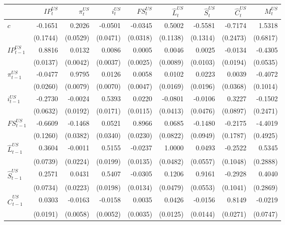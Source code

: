 \begin{sidewaystable}
    \centering
\begin{tabular}{lrrrrrrrr}
        \toprule
        {} &        $IP^{US}_{t}$ &   $\pi^{US}_{t}$ &       $i^{US}_{t}$ &       $FS^{US}_{t}$ &         $\hat{L}^{US}_{t}$ &         $\hat{S}^{US}_{t}$ &         $\hat{C}^{US}_{t}$ &   $M^{US}_{t}$ \\
        \midrule
    $c$ & -0.1651 & 0.2026 & -0.0501 & -0.0345 & 0.5002 & -0.5581 & -0.7174 & 1.5318 \\
     & (0.1744) & (0.0529) & (0.0471) & (0.0318) & (0.1138) & (0.1314) & (0.2473) & (0.6817) \\
    $IP^{US}_{t-1}$ & 0.8816 & 0.0132 & 0.0086 & 0.0005 & 0.0046 & 0.0025 & -0.0134 & -0.4305 \\
     & (0.0137) & (0.0042) & (0.0037) & (0.0025) & (0.0089) & (0.0103) & (0.0194) & (0.0535) \\
    $\pi^{US}_{t-1}$ & -0.0477 & 0.9795 & 0.0126 & 0.0058 & 0.0102 & 0.0223 & 0.0039 & -0.4072 \\
     & (0.0260) & (0.0079) & (0.0070) & (0.0047) & (0.0169) & (0.0196) & (0.0368) & (0.1014) \\
    $i^{US}_{t-1}$ & -0.2730 & -0.0024 & 0.5393 & 0.0220 & -0.0801 & -0.0106 & 0.3227 & -0.1502 \\
     & (0.0632) & (0.0192) & (0.0171) & (0.0115) & (0.0413) & (0.0476) & (0.0897) & (0.2471) \\
    $FS^{US}_{t-1}$ & -0.6609 & -0.1468 & 0.0521 & 0.8966 & 0.0685 & -0.1480 & -0.2175 & -4.4019 \\
     & (0.1260) & (0.0382) & (0.0340) & (0.0230) & (0.0822) & (0.0949) & (0.1787) & (0.4925) \\
    $\hat{L}^{US}_{t-1}$ & 0.3604 & -0.0011 & 0.5155 & -0.0237 & 1.0000 & 0.0493 & -0.2522 & 0.5345 \\
     & (0.0739) & (0.0224) & (0.0199) & (0.0135) & (0.0482) & (0.0557) & (0.1048) & (0.2888) \\
    $\hat{S}^{US}_{t-1}$ & 0.2571 & 0.0431 & 0.5407 & -0.0305 & 0.1206 & 0.9161 & -0.2928 & 0.4040 \\
     & (0.0734) & (0.0223) & (0.0198) & (0.0134) & (0.0479) & (0.0553) & (0.1041) & (0.2869) \\
    $\hat{C}^{US}_{t-1}$ & 0.0303 & -0.0163 & -0.0158 & 0.0035 & 0.0426 & -0.0156 & 0.8149 & -0.0219 \\
     & (0.0191) & (0.0058) & (0.0052) & (0.0035) & (0.0125) & (0.0144) & (0.0271) & (0.0747) \\

\end{tabular}
\end{sidewaystable}
